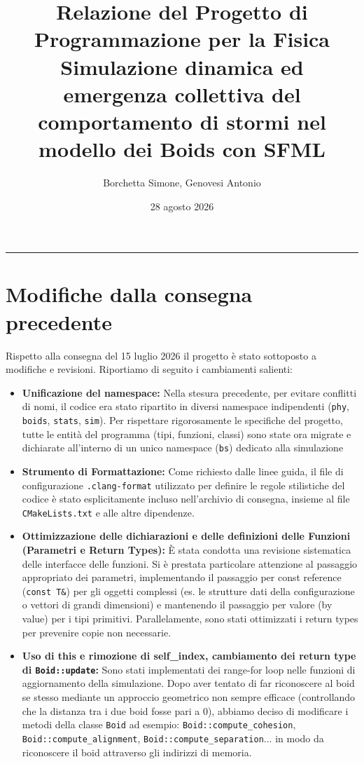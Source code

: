 \documentclass[11pt, a4paper]{article}
\title{
    \textbf{Relazione del Progetto di Programmazione per la Fisica} \\
    \vspace{0.3cm}
    \large Simulazione dinamica ed emergenza collettiva del comportamento di stormi nel modello dei Boids con SFML
}
\author{Borchetta Simone, Genovesi Antonio}
\date{28 agosto 2026}
\begin{document}
\maketitle
\hrule
\vspace{0.5cm}
\section*{Modifiche dalla consegna precedente}
Rispetto alla consegna del 15 luglio 2026 il progetto è stato sottoposto a modifiche e revisioni. Riportiamo di seguito i cambiamenti salienti:
\begin{itemize}
    \item \textbf{Unificazione del namespace: }Nella stesura precedente, per evitare conflitti di nomi, il codice era stato ripartito in diversi namespace indipendenti 
    (\texttt{phy}, \texttt{boids}, \texttt{stats}, \texttt{sim}). Per rispettare rigorosamente le specifiche del progetto, tutte le entità del programma (tipi, funzioni, classi) sono state ora migrate e dichiarate all'interno di un unico namespace (\texttt{bs}) dedicato alla simulazione
    \item \textbf{Strumento di Formattazione: }Come richiesto dalle linee guida, il file di configurazione \texttt{.clang-format} utilizzato per definire le regole stilistiche del codice è stato esplicitamente incluso nell'archivio di consegna, insieme al file \texttt{CMakeLists.txt} e alle altre dipendenze.  
    \item \textbf{Ottimizzazione delle dichiarazioni e delle definizioni delle Funzioni (Parametri e Return Types): }È stata condotta una revisione sistematica delle interfacce delle funzioni. Si è prestata particolare attenzione al passaggio appropriato dei parametri, implementando il passaggio per const reference (\texttt{const T\&}) 
    per gli oggetti complessi (es. le strutture dati della configurazione o vettori di grandi dimensioni) e mantenendo il passaggio per valore (by value) per i tipi primitivi. Parallelamente, sono stati ottimizzati i return types per prevenire copie non necessarie.
    \item \textbf{Uso di this e rimozione di self\_index, cambiamento dei return type di \texttt{Boid::update}: }Sono stati implementati dei range-for loop nelle funzioni di aggiornamento della simulazione. Dopo aver tentato di far riconoscere al boid se stesso mediante un approccio geometrico non sempre efficace (controllando che la distanza tra i due boid fosse pari a 0), abbiamo deciso di modificare i metodi della classe \texttt{Boid} ad esempio: \texttt{Boid::compute\_cohesion}, \texttt{Boid::compute\_alignment}, \texttt{Boid::compute\_separation}... in modo da riconoscere il boid attraverso gli indirizzi di memoria.

\end{itemize}
\end{document}
